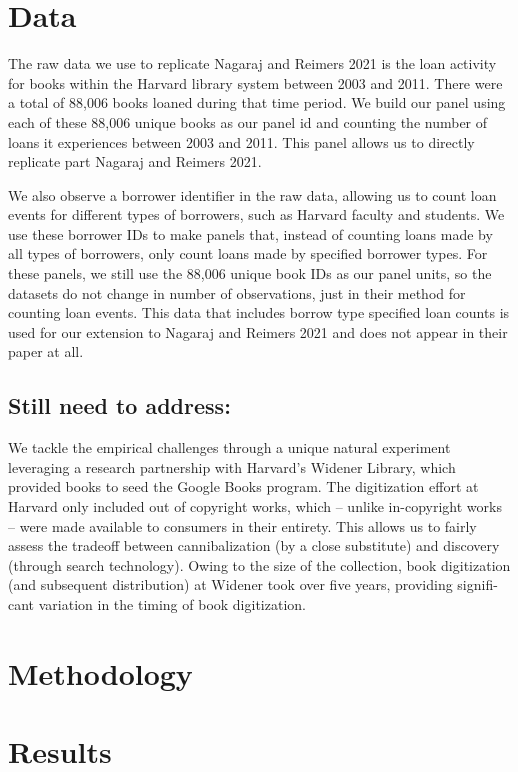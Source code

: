 \documentclass{article}
\begin{document}
\section{Data}
The raw data we use to replicate Nagaraj and Reimers 2021 is the loan activity for books within the Harvard library system between 2003 and 2011. There were a total of 88,006 books loaned during that time period. We build our panel using each of these 88,006 unique books as our panel id and counting the number of loans it experiences between 2003 and 2011. This panel allows us to directly replicate part Nagaraj and Reimers 2021. 

We also observe a borrower identifier in the raw data, allowing us to count loan events for different types of borrowers, such as Harvard faculty and students. We use these borrower IDs to make panels that, instead of counting loans made by all types of borrowers, only count loans made by specified borrower types. For these panels, we still use the 88,006 unique book IDs as our panel units, so the datasets do not change in number of observations, just in their method for counting loan events. This data that includes borrow type specified loan counts is used for our extension to Nagaraj and Reimers 2021 and does not appear in their paper at all. 

\subsection{Still need to address:}
We tackle the empirical challenges through a unique natural experiment leveraging a research partnership with Harvard’s Widener Library, which provided books to seed the Google Books program. The digitization effort at Harvard only included out of copyright works, which – unlike in-copyright works – were made available to consumers in their entirety. This allows us to fairly assess the tradeoff between cannibalization (by a close substitute) and discovery (through search technology). Owing to the size of the collection, book digitization (and subsequent distribution) at Widener took over five years, providing signifi- cant variation in the timing of book digitization.
\section{Methodology}

\section{Results}
\end{document}
